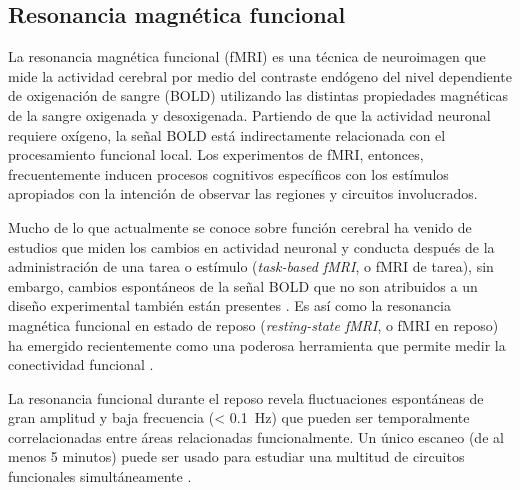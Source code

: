 \subsection{Resonancia magnética funcional}
La resonancia magnética funcional (fMRI) es una técnica de neuroimagen que mide la actividad cerebral por medio del contraste endógeno del nivel dependiente de oxigenación de sangre (BOLD) \parencite{Ogawa1993} utilizando las distintas propiedades magnéticas de la sangre oxigenada y desoxigenada.
Partiendo de que la actividad neuronal requiere oxígeno, la señal BOLD está indirectamente relacionada con el procesamiento funcional local.
Los experimentos de fMRI, entonces, frecuentemente inducen procesos cognitivos específicos con los estímulos apropiados con la intención de observar las regiones y circuitos involucrados. \par
Mucho de lo que actualmente se conoce sobre función cerebral ha venido de estudios que miden los cambios en actividad neuronal y conducta después de la administración de una tarea o estímulo (\textit{task-based fMRI}, o fMRI de tarea), sin embargo, cambios espontáneos de la señal BOLD que no son atribuidos a un diseño experimental también están presentes \parencite{Fox2007}.
Es así como la resonancia magnética funcional en estado de reposo (\textit{resting-state fMRI}, o fMRI en reposo) ha emergido recientemente como una poderosa herramienta que permite medir la conectividad funcional \parencite{Biswal2010}.\par
La resonancia funcional durante el reposo revela fluctuaciones espontáneas de gran amplitud y baja frecuencia (\deactivatequoting\SI{< 0.1}{\hertz}\activatequoting) que pueden ser temporalmente correlacionadas entre áreas relacionadas funcionalmente.
Un único escaneo (de al menos 5 minutos) puede ser usado para estudiar una multitud de circuitos funcionales simultáneamente \parencite{Biswal2010}.

